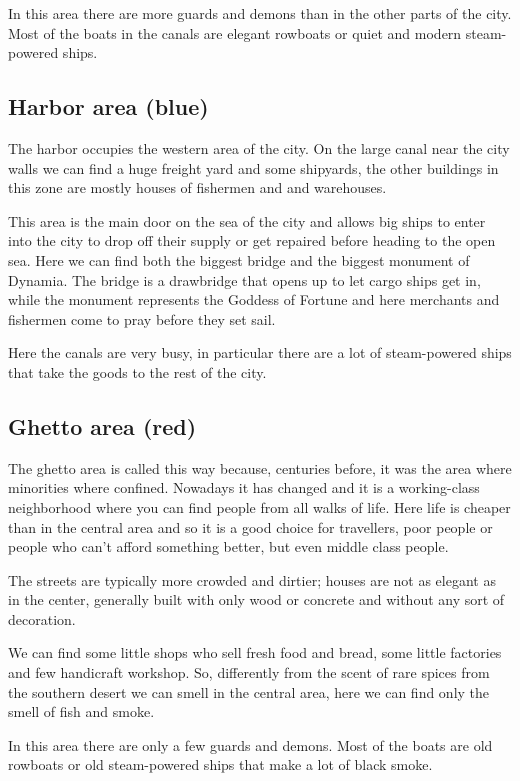 In this area there are more guards and demons than in the other parts of the city. Most of the boats in the canals are elegant rowboats or quiet and modern steam-powered ships.

\subsection{Harbor area (blue)}
The harbor occupies the western area of the city. On the large canal near the city walls we can find a huge freight yard and some shipyards, the  other buildings in this zone are mostly houses of fishermen and and warehouses.

This area is the main door on the sea of the city and allows big ships to enter into the city to drop off their supply or get repaired before heading to the open sea. Here we can find both the biggest bridge and the biggest monument of Dynamia. The bridge is a drawbridge that opens up to let cargo ships get in, while the monument represents the Goddess of Fortune and here merchants and fishermen come to pray before they set sail.

Here the canals are very busy, in particular there are a lot of steam-powered ships that take the goods to the rest of the city.

\subsection{Ghetto area (red)}
The ghetto area is called this way because, centuries before, it was the area where  minorities where confined. Nowadays it has changed and it is a working-class neighborhood where you can find people from all walks of life. Here life is cheaper than in the central area and so it is a good choice for travellers, poor people or people who can't afford something better, but even middle class people.

The streets are typically more crowded and dirtier; houses are not as elegant as in the center, generally built with only wood or concrete and without any sort of decoration.

We can find some little shops who sell fresh food and bread, some little factories and few handicraft workshop. So, differently from the scent of rare spices from the southern desert we can smell in the central area, here we can find only the smell of fish and smoke.

In this area there are only a few guards and demons. Most of the boats are old rowboats or old steam-powered ships that make a lot of black smoke.
